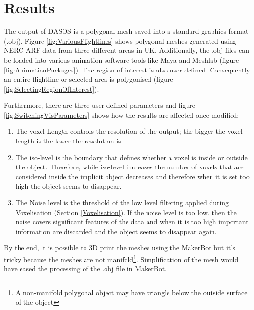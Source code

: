 \documentclass{subfiles}
\begin{document}
\section{Results}\label{sec:MCResults}

\par The output of DASOS is a polygonal mesh saved into a standard graphics format (.obj). Figure \ref{fig:VariousFlightlines} shows polygonal meshes generated using NERC-ARF data from three different areas in UK. Additionally, the .obj files can be loaded into various animation software tools like Maya and Meshlab (figure \ref{fig:AnimationPackages}). The region of interest is also user defined. Consequently an entire flightline or selected area is polygonised (figure \ref{fig:SelectingRegionOfInterest}). 

\par Furthermore, there are three user-defined parameters and figure \ref{fig:SwitchingVisParameters} shows how the results are affected once modified:
\begin{enumerate}
	\item The voxel Length controls the resolution of the output; the bigger the voxel length is the lower the resolution is.
	\item The iso-level is the boundary that defines whether a voxel is inside or outside the object. Therefore, while iso-level increases the number of voxels that are considered inside the implicit object decreases and therefore when it is set too high the object seems to disappear.
	\item The Noise level is the threshold of the low level filtering applied during Voxelisation (Section \ref{Voxelisation}). If the noise level is too low, then the noise covers significant features of the data and when it is too high important information are discarded and the object seems to disappear again.
\end{enumerate}  

 
\par By the end, it is possible to 3D print the meshes using the MakerBot but it's tricky because the meshes are not manifold\footnote{ A non-manifold polygonal object may have triangle below the outside surface of the object}. Simplification of the mesh would have eased the processing of the .obj file in MakerBot. 
 
\end{document}
